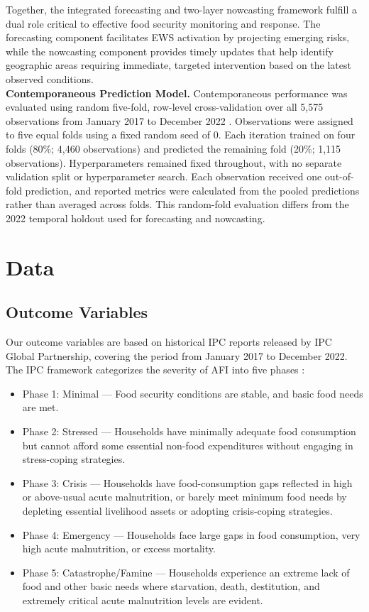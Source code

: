 \documentclass[pdflatex,sn-mathphys-num]{sn-jnl}%
\theoremstyle{thmstyleone}%
\theoremstyle{thmstyletwo}%
\theoremstyle{thmstylethree}%
\begin{document}
Together, the integrated forecasting and two-layer nowcasting framework fulfill a dual role critical to effective food security monitoring and response. The forecasting component facilitates EWS activation by projecting emerging risks, while the nowcasting component provides timely updates that help identify geographic areas requiring immediate, targeted intervention based on the latest observed conditions.\\

\noindent\textbf{Contemporaneous Prediction Model.} 
Contemporaneous performance was evaluated using random five-fold, row-level cross-validation over all 5,575 observations from January 2017 to December 2022 \cite{yeh2020using}. Observations were assigned to five equal folds using a fixed random seed of 0. Each iteration trained on four folds (80\%; 4,460 observations) and predicted the remaining fold (20\%; 1,115 observations). Hyperparameters remained fixed throughout, with no separate validation split or hyperparameter search. Each observation received one out-of-fold prediction, and reported metrics were calculated from the pooled predictions rather than averaged across folds. This random-fold evaluation differs from the 2022 temporal holdout used for forecasting and nowcasting.


\section*{Data}

\subsection*{Outcome Variables}

Our outcome variables are based on historical IPC reports released by IPC Global Partnership, covering the period from January 2017 to December 2022. The IPC framework categorizes the severity of AFI into five phases \cite{IPC2021}:

\begin{itemize}
  \item Phase 1: Minimal — Food security conditions are stable, and basic food needs are met.
  \item Phase 2: Stressed — Households have minimally adequate food consumption but cannot afford some essential non-food expenditures without engaging in stress-coping strategies.
  \item Phase 3: Crisis — Households have food-consumption gaps reflected in high or above-usual acute malnutrition, or barely meet minimum food needs by depleting essential livelihood assets or adopting crisis-coping strategies.
  \item Phase 4: Emergency — Households face large gaps in food consumption, very high acute malnutrition, or excess mortality.
  \item Phase 5: Catastrophe/Famine — Households experience an extreme lack of food and other basic needs where starvation, death, destitution, and extremely critical acute malnutrition levels are evident.
\end{itemize}
\end{document}
